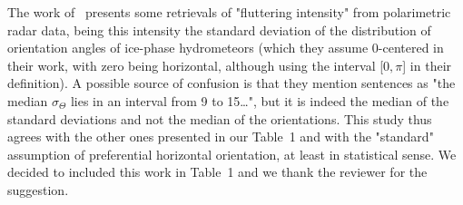 \documentclass[12pt]{article}
\begin{document}
\begin{enumerate}
    The work of~\cite{Melnikov_JAOT_2013} presents some retrievals of "fluttering intensity" from polarimetric radar data, being this intensity the standard deviation of the  distribution of orientation angles of ice-phase hydrometeors (which they assume  0-centered in their work, with zero being horizontal, although using the interval [$0,\pi$] in their definition). A possible source of confusion is that they mention sentences as "the median $\sigma_{\Theta}$ lies in an interval from 9 to 15\dots", but it is indeed the median of the standard deviations and not the median of the orientations. This study thus agrees with the other ones presented in our Table~1 and with the "standard" assumption of preferential horizontal orientation, at least in statistical sense. We decided to included this work in Table~1 and we thank the reviewer for the suggestion.    
    
\end{enumerate}



\end{document}
